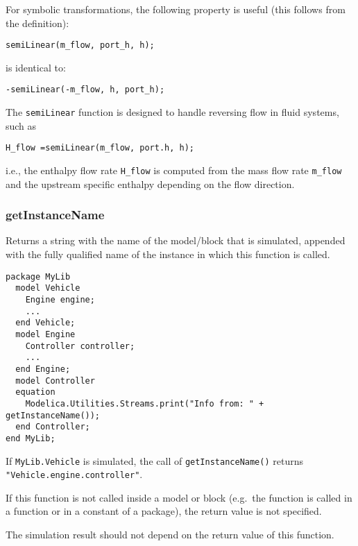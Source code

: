 \begin{nonnormative}
For symbolic transformations, the following property is useful
(this follows from the definition):
\begin{lstlisting}[language=modelica]
semiLinear(m_flow, port_h, h);
\end{lstlisting}
is identical to:
\begin{lstlisting}[language=modelica]
-semiLinear(-m_flow, h, port_h);
\end{lstlisting}

The \lstinline!semiLinear! function is designed to handle reversing
flow in fluid systems, such as
\begin{lstlisting}[language=modelica]
H_flow =semiLinear(m_flow, port.h, h);
\end{lstlisting}
i.e., the enthalpy flow rate \lstinline!H_flow! is computed from the
mass flow rate \lstinline!m_flow! and the upstream specific enthalpy
depending on the flow direction.
\end{nonnormative}

\subsubsection{getInstanceName}\label{getinstancename}

Returns a string with the name of the model/block that is simulated,
appended with the fully qualified name of the instance in which this
function is called.

\begin{example}
\begin{lstlisting}[language=modelica]
package MyLib
  model Vehicle
    Engine engine;
    ...
  end Vehicle;
  model Engine
    Controller controller;
    ...
  end Engine;
  model Controller
  equation
    Modelica.Utilities.Streams.print("Info from: " + getInstanceName());
  end Controller;
end MyLib;
\end{lstlisting}
If \lstinline!MyLib.Vehicle! is simulated, the call of \lstinline!getInstanceName()!
returns \lstinline!"Vehicle.engine.controller"!.
\end{example}

If this function is not called inside a model or block (e.g.\ the
function is called in a function or in a constant of a package), the
return value is not specified.

\begin{nonnormative}
The simulation result should not depend on the return value of this function.
\end{nonnormative}

